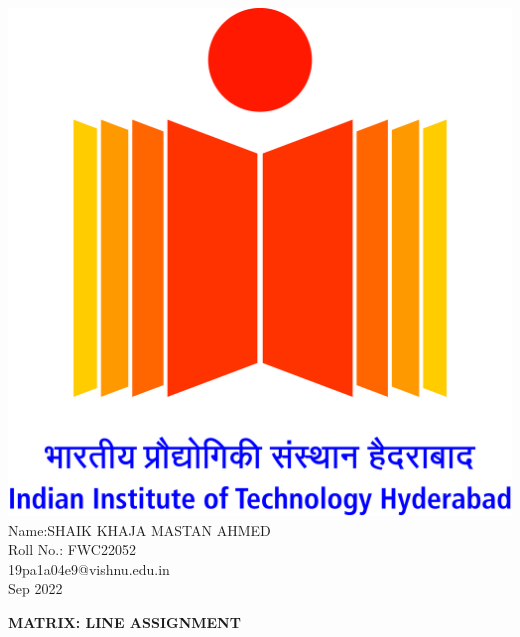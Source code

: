 \documentclass[10pt,a4paper]{report}
\begin{document}
\begin{multicols}{2}
\raggedright {\includegraphics[scale=0.06]{IITH logo.jpg}} \vspace{3mm}\\ \raggedleft Name:SHAIK KHAJA MASTAN AHMED\vspace{2mm}\\ \raggedleft Roll No.: FWC22052\vspace{2mm}\\ \raggedleft 19pa1a04e9@vishnu.edu.in \vspace{2mm}\\ \raggedleft Sep 2022 \vspace{5mm}\\

\end{multicols}
\centering \Large \textbf{MATRIX: LINE ASSIGNMENT} \normalsize \vspace{10mm}
\end{document}
